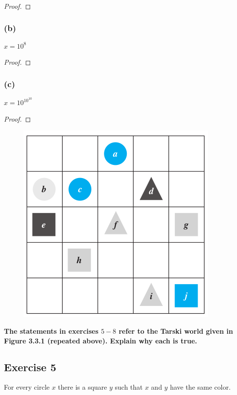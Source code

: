 \documentclass[14pt]{extarticle}
\begin{document}
\begin{proof}

\end{proof}

\subsubsection{(b)}
$x = 10^8$

\begin{proof}

\end{proof}

\subsubsection{(c)}
$x = 10^{10^{10}}$

\begin{proof}

\end{proof}

\begin{figure}[ht!]
\centering
\includegraphics[scale=0.4]{../images/3.3.1.png}
\end{figure}

{\bf \color{cyan} The statements in exercises $5-8$ refer to the Tarski world given in Figure 3.3.1 (repeated above). Explain why each is true.}

\subsection{Exercise 5}
For every circle $x$ there is a square $y$ such that $x$ and $y$ have the same color.
\end{document}
